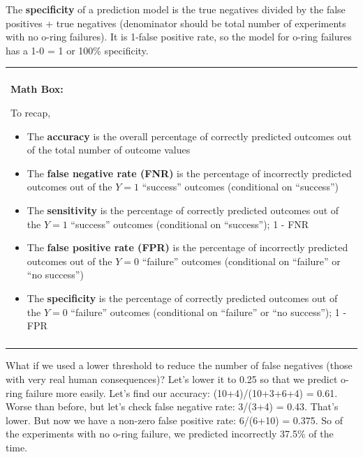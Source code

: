 \documentclass[
]{book}
\newenvironment{Shaded}{\begin{snugshade}}{\end{snugshade}}
\newcommand{\DataTypeTok}[1]{\textcolor[rgb]{0.13,0.29,0.53}{#1}}
\newcommand{\FloatTok}[1]{\textcolor[rgb]{0.00,0.00,0.81}{#1}}
\newcommand{\KeywordTok}[1]{\textcolor[rgb]{0.13,0.29,0.53}{\textbf{#1}}}
\newcommand{\NormalTok}[1]{#1}
\newcommand{\OperatorTok}[1]{\textcolor[rgb]{0.81,0.36,0.00}{\textbf{#1}}}
\newcommand{\StringTok}[1]{\textcolor[rgb]{0.31,0.60,0.02}{#1}}
\newenvironment{mathbox}
{
    \begin{center}
    
    \begin{tabular}{|p{0.8\textwidth}|}
    \rowcolor{LightYellow}
    \hline\\
    \rowcolor{LightYellow}
    \textbf{Math Box:}
}
{
    \\\rowcolor{LightYellow}
    \\\hline
    \end{tabular} 
    \end{center}
}
\begin{document}
The \textbf{specificity} of a prediction model is the true negatives divided by the false positives + true negatives (denominator should be total number of experiments with no o-ring failures). It is 1-false positive rate, so the model for o-ring failures has a 1-0 = 1 or 100\% specificity.

\begin{mathbox}
To recap,

\begin{itemize}
\item
  The \textbf{accuracy} is the overall percentage of correctly predicted
  outcomes out of the total number of outcome values
\item
  The \textbf{false negative rate (FNR)} is the percentage of
  incorrectly predicted outcomes out of the \(Y=1\) ``success'' outcomes
  (conditional on ``success'')
\item
  The \textbf{sensitivity} is the percentage of correctly predicted
  outcomes out of the \(Y=1\) ``success'' outcomes (conditional on
  ``success''); 1 - FNR
\item
  The \textbf{false positive rate (FPR)} is the percentage of
  incorrectly predicted outcomes out of the \(Y=0\) ``failure'' outcomes
  (conditional on ``failure'' or ``no success'')
\item
  The \textbf{specificity} is the percentage of correctly predicted
  outcomes out of the \(Y=0\) ``failure'' outcomes (conditional on
  ``failure'' or ``no success''); 1 - FPR
\end{itemize}
\end{mathbox}

What if we used a lower threshold to reduce the number of false negatives (those with very real human consequences)? Let's lower it to 0.25 so that we predict o-ring failure more easily. Let's find our accuracy: (10+4)/(10+3+6+4) = 0.61. Worse than before, but let's check false negative rate: 3/(3+4) = 0.43. That's lower. But now we have a non-zero false positive rate: 6/(6+10) = 0.375. So of the experiments with no o-ring failure, we predicted incorrectly 37.5\% of the time.

\begin{Shaded}
\end{Shaded}
\end{document}
